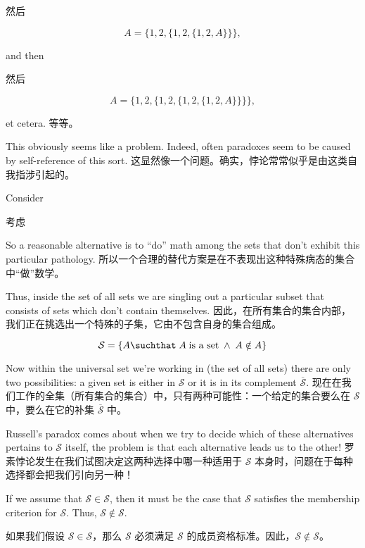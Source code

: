 \noindent 然后

\[ A = \{ 1, 2, \{ 1, 2, \{ 1, 2, A \} \} \}, \]

\noindent and then

\noindent 然后

\[ A = \{ 1, 2, \{ 1, 2, \{ 1, 2, \{ 1, 2, A \} \} \} \}, \]
  
\noindent et cetera.
\noindent 等等。

This obviously seems like a problem.  Indeed, often paradoxes seem to
be caused by self-reference of this sort.
这显然像一个问题。确实，悖论常常似乎是由这类自我指涉引起的。

Consider 

考虑

\begin{center} 
\end{center}

So a reasonable alternative
is to ``do'' math among the sets that don't exhibit this particular
pathology.
所以一个合理的替代方案是在不表现出这种特殊病态的集合中“做”数学。

Thus, inside the set of all sets we are singling out a particular subset
that consists of sets which don't contain themselves.
因此，在所有集合的集合内部，我们正在挑选出一个特殊的子集，它由不包含自身的集合组成。

\[ {\mathcal S} = \{ A \suchthat \; A \; \mbox{is a set} \; \land \; A \notin A \} \]

Now within the universal set we're working in (the set of all sets) there
are only two possibilities: a given set is either in ${\mathcal S}$ or
it is in its complement $\overline{\mathcal S}$.
现在在我们工作的全集（所有集合的集合）中，只有两种可能性：一个给定的集合要么在 ${\mathcal S}$ 中，要么在它的补集 $\overline{\mathcal S}$ 中。

Russell's paradox 
comes about when we try to decide which of these alternatives pertains
to ${\mathcal S}$ itself, the problem is that each alternative leads us 
to the other!
罗素悖论发生在我们试图决定这两种选择中哪一种适用于 ${\mathcal S}$ 本身时，问题在于每种选择都会把我们引向另一种！

If we assume that ${\mathcal S} \in {\mathcal S}$, then it must be the 
case that ${\mathcal S}$ satisfies the membership criterion for ${\mathcal S}$.
Thus, ${\mathcal S} \notin {\mathcal S}$.

如果我们假设 ${\mathcal S} \in {\mathcal S}$，那么 ${\mathcal S}$ 必须满足 ${\mathcal S}$ 的成员资格标准。因此，${\mathcal S} \notin {\mathcal S}$。

